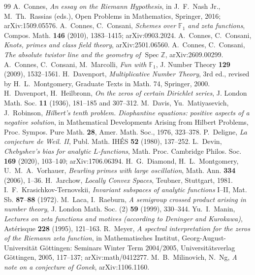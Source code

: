 \begin{thebibliography}{99}
 A.~Connes, \emph{An essay on the Riemann Hypothesis}, in J.~F.~Nash Jr., M.~Th.~Rassias (eds.), Open Problems in Mathematics, Springer, 2016; arXiv:1509.05576.
 A.~Connes, C.~Consani, \emph{Schemes over $\mathbb{F}_1$ and zeta functions}, Compos. Math. \textbf{146} (2010), 1383--1415; arXiv:0903.2024.
 A.~Connes, C.~Consani, \emph{Knots, primes and class field theory}, arXiv:2501.06560.
 A.~Connes, C.~Consani, \emph{The absolute twistor line and the geometry of $\operatorname{Spec}\mathbb{Z}$}, arXiv:2609.00299.
 A.~Connes, C.~Consani, M.~Marcolli, \emph{Fun with $\mathbb{F}_1$}, J. Number Theory \textbf{129} (2009), 1532--1561.
 H.~Davenport, \emph{Multiplicative Number Theory}, 3rd ed., revised by H.~L.~Montgomery, Graduate Texts in Math. 74, Springer, 2000.
 H.~Davenport, H.~Heilbronn, \emph{On the zeros of certain Dirichlet series}, J. London Math. Soc. \textbf{11} (1936), 181--185 and 307--312.
 M.~Davis, Yu.~Matiyasevich, J.~Robinson, \emph{Hilbert's tenth problem. Diophantine equations: positive aspects of a negative solution}, in Mathematical Developments Arising from Hilbert Problems, Proc. Sympos. Pure Math. \textbf{28}, Amer. Math. Soc., 1976, 323--378.
 P.~Deligne, \emph{La conjecture de Weil. II}, Publ. Math. IHÉS \textbf{52} (1980), 137--252.
 L.~Devin, \emph{Chebyshev's bias for analytic $L$-functions}, Math. Proc. Cambridge Philos. Soc. \textbf{169} (2020), 103--140; arXiv:1706.06394.
 H.~G.~Diamond, H.~L.~Montgomery, U.~M.~A.~Vorhauer, \emph{Beurling primes with large oscillation}, Math. Ann. \textbf{334} (2006), 1--36.
 H.~Jarchow, \emph{Locally Convex Spaces}, Teubner, Stuttgart, 1981.
 I.~F.~Krasichkov-Ternovskii, \emph{Invariant subspaces of analytic functions} I--II, Mat. Sb. \textbf{87}--\textbf{88} (1972).
 M.~Laca, I.~Raeburn, \emph{A semigroup crossed product arising in number theory}, J. London Math. Soc. (2) \textbf{59} (1999), 330--344.
 Yu.~I.~Manin, \emph{Lectures on zeta functions and motives (according to Deninger and Kurokawa)}, Astérisque \textbf{228} (1995), 121--163.
 R.~Meyer, \emph{A spectral interpretation for the zeros of the Riemann zeta function}, in Mathematisches Institut, Georg-August-Universität Göttingen: Seminars Winter Term 2004/2005, Universitätsverlag Göttingen, 2005, 117--137; arXiv:math/0412277.
 M.~B.~Milinovich, N.~Ng, \emph{A note on a conjecture of Gonek}, arXiv:1106.1160.

\end{thebibliography}
